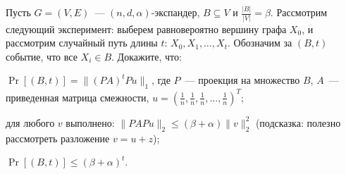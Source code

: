 Пусть $G = (V, E)$~--- $(n, d, \alpha)$-экспандер, $B \subseteq V$ и $\frac{|B|}{|V|} = \beta$. Рассмотрим следующий
эксперимент: выберем равновероятно вершину графа $X_0$, и рассмотрим случайный путь длины $t$: $X_0, X_1, \dots,
X_t$. Обозначим за $(B, t)$ событие, что все $X_i \in B$. Докажите, что:
\begin{enumcyr}
    \item $\Pr[(B, t)] = \|(PA)^tP u\|_1$, где $P$~--- проекция на множество $B$, $A$~--- приведенная матрица смежности,
    	$u = (\frac{1}{n}, \frac{1}{n}, \frac{1}{n}, \dots, \frac{1}{n})^{T}$;
    \item для любого $v$ выполнено: $\|PAP u\|_2 \le (\beta + \alpha) \|v\|_2^2$ (подсказка: полезно рассмотреть разложение
	    $v = u + z$);
    \item $\Pr[(B, t)] \le (\beta + \alpha)^t$.
\end{enumcyr}